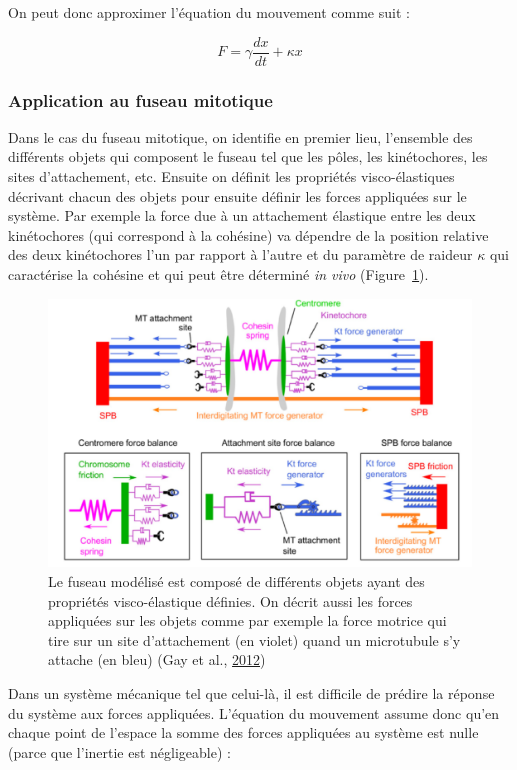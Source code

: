 \documentclass[12pt,a4paper,twoside,openright]{book}
\begin{document}
On peut donc approximer l'équation du mouvement comme suit :

\[
F = \gamma\frac{dx}{dt} + \kappa x
\]

\subsubsection{Application au fuseau
mitotique}\label{application-au-fuseau-mitotique}

Dans le cas du fuseau mitotique, on identifie en premier lieu,
l'ensemble des différents objets qui composent le fuseau tel que les
pôles, les kinétochores, les sites d'attachement, etc. Ensuite on
définit les propriétés visco-élastiques décrivant chacun des objets pour
ensuite définir les forces appliquées sur le système. Par exemple la
force due à un attachement élastique entre les deux kinétochores (qui
correspond à la cohésine) va dépendre de la position relative des deux
kinétochores l'un par rapport à l'autre et du paramètre de raideur
\(\kappa\) qui caractérise la cohésine et qui peut être déterminé
\emph{in vivo} (Figure~\ref{fig:spindle_model}).

\begin{figure}[htbp]
\centering
\includegraphics{figures/intro/spindle_model.png}
\caption{\label{fig:spindle_model}Le fuseau modélisé est composé de
différents objets ayant des propriétés visco-élastique définies. On
décrit aussi les forces appliquées sur les objets comme par exemple la
force motrice qui tire sur un site d'attachement (en violet) quand un
microtubule s'y attache (en bleu) (Gay et al.,
\protect\hyperlink{ref-Gay2012a}{2012})}
\end{figure}

Dans un système mécanique tel que celui-là, il est difficile de prédire
la réponse du système aux forces appliquées. L'équation du mouvement
assume donc qu'en chaque point de l'espace la somme des forces
appliquées au système est nulle (parce que l'inertie est négligeable) :
\end{document}
